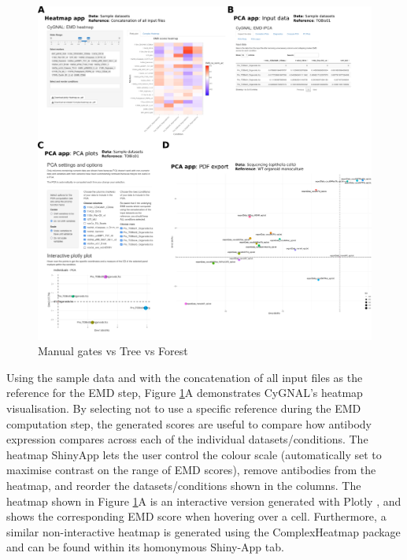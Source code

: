 \begin{figure}
    \centering
    \includegraphics{03cytof/figs/3CYGNAL_usageVIS.png}
    \caption{Manual gates vs Tree vs Forest}
    \label{fig:3cygvis}
\end{figure}

Using the sample data and with the concatenation of all input files as the reference for the EMD step, Figure \ref{fig:3cygvis}A demonstrates CyGNAL's heatmap visualisation. By selecting not to use a specific reference during the EMD computation step, the generated scores are useful to compare how antibody expression compares across each of the individual datasets/conditions. The heatmap ShinyApp lets the user control the colour scale (automatically set to maximise contrast on the range of EMD scores), remove antibodies from the heatmap, and reorder the datasets/conditions shown in the columns. The heatmap shown in Figure \ref{fig:3cygvis}A is an interactive version generated with Plotly \cite{plotly_technologies_inc_collaborative_2015}, and shows the corresponding EMD score when hovering over a cell. Furthermore, a similar non-interactive heatmap is generated using the ComplexHeatmap \cite{gu_complexheatmap_2021} package and can be found within its homonymous Shiny-App tab.

